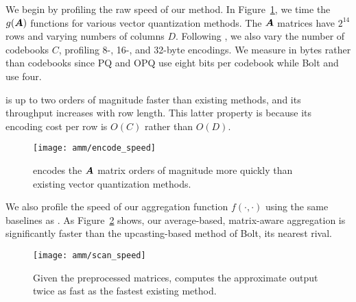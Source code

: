 We begin by profiling the raw speed of our method. In Figure~\ref{fig:encodeSpeed}, we time the $g(\bm{A})$ functions for various vector quantization methods. The $\bm{A}$ matrices have $2^{14}$ rows and varying numbers of columns $D$. Following \citet{bolt}, we also vary the number of codebooks $C$, profiling 8-, 16-, and 32-byte encodings. We measure in bytes rather than codebooks since PQ and OPQ use eight bits per codebook while Bolt and \oursp use four.

\oursp is up to two orders of magnitude faster than existing methods, and its throughput increases with row length. This latter property is because its encoding cost per row is $O(C)$ rather than $O(D)$.
\begin{figure}[h]
\begin{center}
\texttt{[image: amm/encode\_speed]}
\caption{\oursp encodes the $\bm{A}$ matrix orders of magnitude more quickly than existing vector quantization methods.}
\label{fig:encodeSpeed}
\end{center}
\end{figure}

\vspace{-1mm}
We also profile the speed of our aggregation function $f(\cdot, \cdot)$ using the same baselines as \citet{bolt}. As Figure~\ref{fig:scanSpeed} shows, our average-based, matrix-aware aggregation is significantly faster than the upcasting-based method of Bolt, its nearest rival.
\vspace{2mm}

\begin{figure}[h]
\begin{center}
\texttt{[image: amm/scan\_speed]}
\caption{Given the preprocessed matrices, \oursp computes the approximate output twice as fast as the fastest existing method.}
\label{fig:scanSpeed}
\end{center}
\end{figure}

